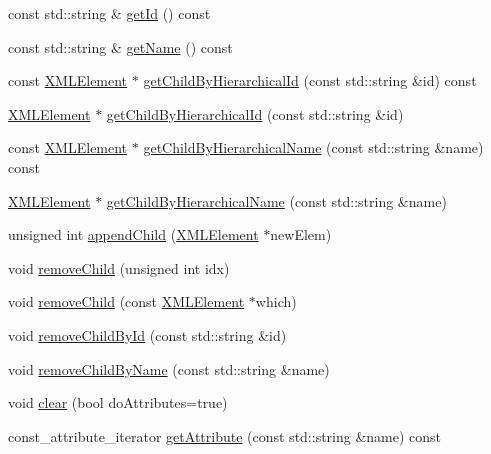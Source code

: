 \begin{DoxyCompactItemize}
\item 
const std\+::string \& \hyperlink{classXMLDOM_1_1XMLElement_a12c51b261667efee2db62c72c2cfccca}{get\+Id} () const 
\item 
const std\+::string \& \hyperlink{classXMLDOM_1_1XMLElement_a91f4ab38d1cea2d53c5190ec51259761}{get\+Name} () const 
\item 
const \hyperlink{classXMLDOM_1_1XMLElement}{X\+M\+L\+Element} $\ast$ \hyperlink{classXMLDOM_1_1XMLElement_a49a63387c3f5f3e23bca6aabb0d3c419}{get\+Child\+By\+Hierarchical\+Id} (const std\+::string \&id) const 
\item 
\hyperlink{classXMLDOM_1_1XMLElement}{X\+M\+L\+Element} $\ast$ \hyperlink{classXMLDOM_1_1XMLElement_ae6c965e2495d76343ce9a167938e8a4c}{get\+Child\+By\+Hierarchical\+Id} (const std\+::string \&id)
\item 
const \hyperlink{classXMLDOM_1_1XMLElement}{X\+M\+L\+Element} $\ast$ \hyperlink{classXMLDOM_1_1XMLElement_ac15c8554200cad88b328b44e9b3d4f6e}{get\+Child\+By\+Hierarchical\+Name} (const std\+::string \&name) const 
\item 
\hyperlink{classXMLDOM_1_1XMLElement}{X\+M\+L\+Element} $\ast$ \hyperlink{classXMLDOM_1_1XMLElement_aaa6d95acff0343578a860246e58dce17}{get\+Child\+By\+Hierarchical\+Name} (const std\+::string \&name)
\item 
unsigned int \hyperlink{classXMLDOM_1_1XMLElement_a01276193af3cda360867f98c82b5ecbb}{append\+Child} (\hyperlink{classXMLDOM_1_1XMLElement}{X\+M\+L\+Element} $\ast$new\+Elem)
\item 
void \hyperlink{classXMLDOM_1_1XMLElement_ae3c90039e128d8125c180761d3019a2b}{remove\+Child} (unsigned int idx)
\item 
void \hyperlink{classXMLDOM_1_1XMLElement_a8c8cbcd6935e451afdfc1de62be0a44b}{remove\+Child} (const \hyperlink{classXMLDOM_1_1XMLElement}{X\+M\+L\+Element} $\ast$which)
\item 
void \hyperlink{classXMLDOM_1_1XMLElement_ab8a1a521c06fef728c0ff5be44c14eec}{remove\+Child\+By\+Id} (const std\+::string \&id)
\item 
void \hyperlink{classXMLDOM_1_1XMLElement_af501dcc46e59d0d9aec560cd92d11d66}{remove\+Child\+By\+Name} (const std\+::string \&name)
\item 
void \hyperlink{classXMLDOM_1_1XMLElement_abe4cbb213e383278b497ca79062c3f5a}{clear} (bool do\+Attributes=true)
\item 
const\+\_\+attribute\+\_\+iterator \hyperlink{classXMLDOM_1_1XMLElement_a2aa40c03f1c2acb1148a304a0a92d154}{get\+Attribute} (const std\+::string \&name) const 

\end{DoxyCompactItemize}
